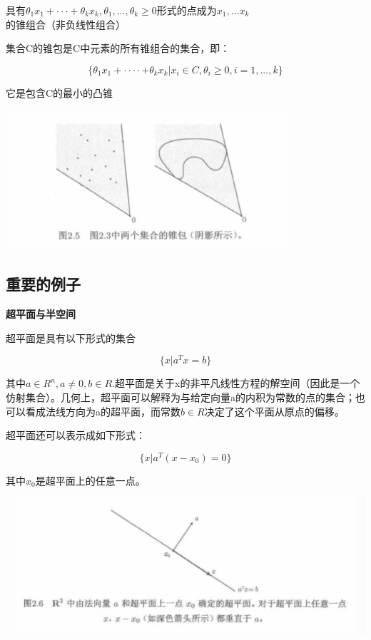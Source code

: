 \documentclass{ctexart}
\begin{document}
	具有\(\theta_1 x_1 + ··· + \theta_k x_k, \theta_1,...,\theta_k \geq 0\)形式的点成为\(x_1,...x_k\)的锥组合（非负线性组合）
	
	集合C的锥包是C中元素的所有锥组合的集合，即：
	
	\[\{\theta_1 x_1 +····+ \theta_k x_k|x_i \in C, \theta_i \geq 0, i =1,...,k\}\]
	
	它是包含C的最小的凸锥
	
	\includegraphics[width=1\linewidth]{pic/pic2_5}
	
	\subsection{重要的例子}
	
	\textbf{超平面与半空间}
	
	超平面是具有以下形式的集合
	
	\[\{x|a^Tx=b\}\]
	
	其中\(a \in R^n, a \neq 0, b \in R\).超平面是关于x的非平凡线性方程的解空间（因此是一个仿射集合）。几何上，超平面可以解释为与给定向量a的内积为常数的点的集合；也可以看成法线方向为a的超平面，而常数\(b \in R\)决定了这个平面从原点的偏移。
	
	超平面还可以表示成如下形式：
	
	\[\{x|a^T(x-x_0)=0\}\]
	
	其中\(x_0\)是超平面上的任意一点。	
	
	\includegraphics[width=1\linewidth]{pic/pic2_6}
	
\end{document}
